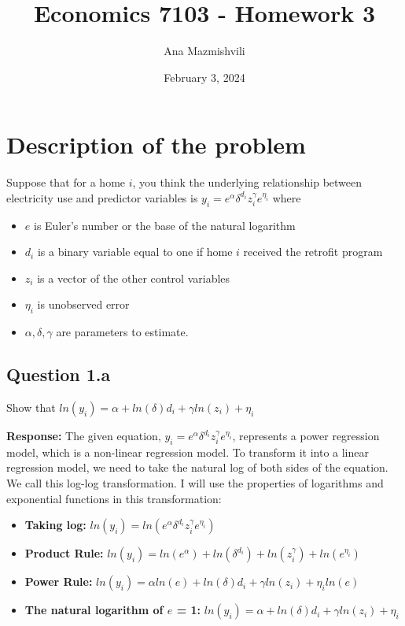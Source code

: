 \documentclass{article}
\title{Economics 7103 - Homework 3}
\author{Ana Mazmishvili}
\date{ February 3, 2024 }
\begin{document}
  
\maketitle 
\section{Description of the problem}
Suppose that for a home \(i\), you think the underlying relationship between electricity use and predictor
variables is \(y_i= e^{\alpha} \delta^{d_i} z_i^\gamma e^{\eta_i}\) where 
\begin{itemize}
    \item \(e\) is Euler’s number or the base of the natural logarithm 
    \item \(d_i\) is a binary variable equal to one if home \(i\) received the retrofit program
    \item \(z_i\) is a vector of the other control variables
    \item \(\eta_i\) is unobserved error 
    \item \({\alpha, \delta, \gamma}\) are parameters to estimate.
\end{itemize}

\subsection*{Question 1.a} 
Show that \(ln(y_i)= \alpha + ln(\delta)d_i + \gamma ln(z_i) + \eta_i\)

\textbf{Response:} 
The given equation, \(y_i= e^{\alpha} \delta^{d_i} z_i^\gamma e^{\eta_i}\), represents a power regression model, which is a non-linear regression model. To transform it into a linear regression model, we need to take the natural log of both sides of the equation. We call this log-log transformation. I will use the properties of logarithms and exponential functions in this transformation:
\begin{itemize}
    \item \textbf{Taking log:} \(ln(y_i)= ln(e^{\alpha} \delta^{d_i} z_i^\gamma e^{\eta_i})\)
    \item \textbf{Product Rule:} \(ln(y_i)= ln(e^{\alpha})+ln(\delta^{d_i}) + ln(z_i^\gamma)+ln(e^{\eta_i})\)
    \item \textbf{Power Rule:} \(ln(y_i)= \alpha ln(e)+ln(\delta)d_i + \gamma ln(z_i) +\eta_iln(e)\)
    \item \textbf{The natural logarithm of \(e\) = 1:} \(ln(y_i)= \alpha + ln(\delta)d_i + \gamma ln(z_i) + \eta_i\)      
\end{itemize}
\end{document}
